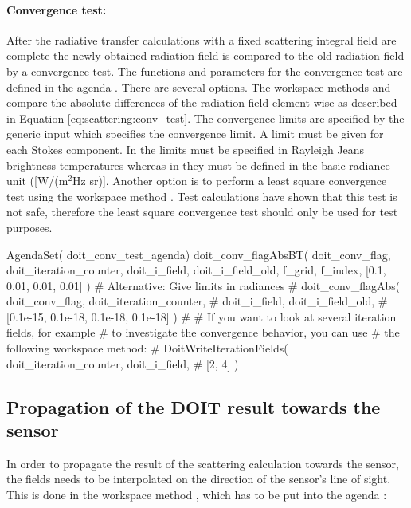 \paragraph{Convergence test:}
After the radiative transfer calculations with a fixed scattering
integral field are complete the newly obtained radiation field is
compared to the old radiation field by a convergence test. The
functions and parameters for the convergence test are defined in the
agenda . There are several
options. The workspace methods  and
 compare the absolute differences of the
radiation field element-wise as described in
Equation \ref{eq:scattering:conv_test}. The convergence limits are specified by the
generic input  which specifies the convergence limit. A limit
must be given for each Stokes component. In
 the limits must be specified in
Rayleigh Jeans brightness temperatures whereas in
 they must be defined in the basic radiance unit
([W/(m$^2$Hz sr)]. Another option is to perform a least square
convergence test using the workspace method
. Test calculations have shown that this
test is not safe, therefore the least square convergence test should
only be used for test purposes.
\begin{code}
AgendaSet( doit_conv_test_agenda) {
    doit_conv_flagAbsBT( doit_conv_flag, doit_iteration_counter,
                         doit_i_field, doit_i_field_old,
                         f_grid, f_index,
                         [0.1, 0.01, 0.01, 0.01] )
    # Alternative: Give limits in radiances
    #   doit_conv_flagAbs( doit_conv_flag, doit_iteration_counter,
    #                      doit_i_field, doit_i_field_old,
    #                      [0.1e-15, 0.1e-18, 0.1e-18, 0.1e-18] )
    #
    # If you want to look at several iteration fields, for example 
    # to investigate the convergence behavior, you can use
    # the following workspace method:
    # DoitWriteIterationFields( doit_iteration_counter, doit_i_field,
    #                           [2, 4] )
}
\end{code}
\subsection{Propagation of the DOIT result towards the sensor}
In order to propagate the result of the scattering calculation towards
the sensor, the fields needs to be interpolated on the direction of
the sensor's line of sight. This is done in the workspace method
, which has to be put into the agenda
:

